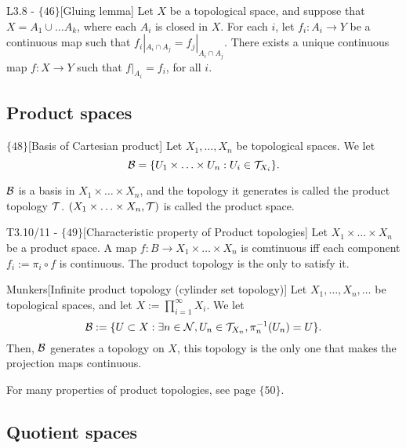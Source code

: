 \documentclass{article}
\begin{document}
\begin{flexilemma}{L3.8 - $\{46\}$}[Gluing lemma]
    Let $X$ be a topological space, and suppose that $X = A_1 \cup \ldots A_k$, where each $A_i$ is closed in $X$. For each $i$, let $f_i : A_i \to Y$ be a continuous map such that $f_i|_{A_i \cap A_j} = f_j|_{A_i \cap A_j}$. There exists a unique continuous map $f:X \to Y$ such that $f|_{A_i} = f_i$, for all $i$.
\end{flexilemma}

\subsection{Product spaces}

\begin{flexidefinition}{$\{48\}$}[Basis of Cartesian product]
    Let $X_1, \ldots, X_n$ be topological spaces. We let 
    \begin{equation}
        \mathcal{B} = \{ U_1 \times \ldots \times U_n : U_i \in \mathcal{T}_{X_i} \}.
    \end{equation}

    $\mathcal{B}$ is a basis in $X_1\times \ldots \times X_n$, and the topology it generates is called the product topology $\mathcal{T}$. $(X_1\times \ldots \times X_n,\mathcal{T})$ is called the product space.
\end{flexidefinition}

\begin{flexitheorem}{T3.10/11 - $\{49\}$}[Characteristic property of Product topologies]
    Let $X_1\times \ldots \times X_n$ be a product space. A map $f : B \to X_1\times \ldots \times X_n$ is comtinuous iff each component $f_i := \pi_i \circ f$ is continuous. The product topology is the only to satisfy it.
\end{flexitheorem}

\begin{flexidefinition}{Munkers}[Infinite product topology (cylinder set topology)]
    Let $X_1, \ldots, X_n, \ldots$ be topological spaces, and let $X := \prod_{i=1}^\infty X_i$. We let 
    \begin{equation}
        \mathcal{B} := \{U \subset X: \exists n \in \mathcal{N}, U_n \in \mathcal{T}_{X_n}, \pi_n^{-1}(U_n) = U\}.
    \end{equation}
    Then, $\mathcal{B}$ generates a topology on $X$, this topology is the only one that makes the projection maps continuous.
\end{flexidefinition}
For many properties of product topologies, see page $\{50\}$.

\subsection{Quotient spaces}
\end{document}
